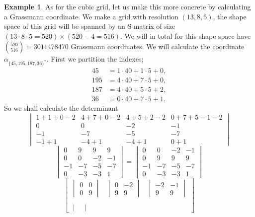 \documentclass[a4paper,12pt]{book}
\theoremstyle{plain}
\theoremstyle{definition}
\newtheorem{Example}[equation]{Example}
\begin{document}
\begin{Example}
	As for the cubic grid, let us make this more concrete by calculating a
	Grassmann coordinate. We make a grid with resolution \( (13, 8, 5) \), the
	shape space of this grid will be spanned by an S-matrix of size
	\( (13 \cdot 8 \cdot 5 = 520) \times (520 - 4 = 516)  \). We will in total
	for this shape space have \( {520 \choose 516} = 3 011 478 470 \)
	Grassmann coordinates. We will calculate the coordinate
	\( \alpha_{\{45, 195, 187, 36\}^*} \). First we partition the indexes;
	\begin{align*}
		45 &= 1 \cdot 40 + 1 \cdot 5 + 0, \\
		195 &= 4 \cdot 40 + 7 \cdot 5 + 0, \\
		187 &= 4 \cdot 40 + 5 \cdot 5 + 2, \\
		36 &= 0 \cdot 40 + 7 \cdot 5 + 1.
	\end{align*}
	So we shall calculate the determinant
	\[
		\begin{vmatrix}
			1 + 1 + 0 -2 & 4 + 7 + 0 - 2 & 4 + 5 + 2 - 2 & 0 + 7 + 5 - 1 - 2 \\
			0 & 0 & -2 & -1 \\
			-1 & -7 & -5 & -7 \\
			-1 + 1 & -4 + 1 & -4 + 1 & 0 + 1
		\end{vmatrix}		
	\]
	\[
		\begin{vmatrix}
			0 & 9 & 9 & 9 \\
			0 & 0 & -2 & -1 \\
			-1 & -7 & -5 & -7 \\
			0 & -3 & -3 & 1
		\end{vmatrix} =
		\begin{vmatrix}
			0 & 0 & -2 & -1 \\
			0 & 9 & 9 & 9 \\
			-1 & -7 & -5 & -7 \\
			0 & -3 & -3 & 1
		\end{vmatrix}	
	\]
	\[
		\begin{bmatrix}
			\begin{vmatrix}
				0 & 0 \\ 0 & 9
			\end{vmatrix} & \begin{vmatrix}
				0 & -2 \\ 9 & 9
			\end{vmatrix} & \begin{vmatrix}
				-2 & -1 \\ 9 & 9
			\end{vmatrix} \\ & & \\ \begin{vmatrix}

\end{vmatrix}
\end{bmatrix}\]
\end{Example}
\end{document}
